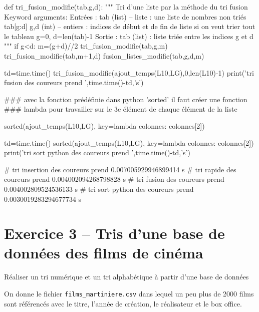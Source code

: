 \begin{corrige}
\begin{python}
def tri_fusion_modifie(tab,g,d):
    """
    Tri d'une liste par la méthode du tri fusion
    Keyword arguments:
    Entrées : 
        tab (list) -- liste : une liste de nombres non triés tab[g:d]
        g,d (int) -- entiers : indices de début et de fin de liste si on veut trier
                           tout le tableau g=0, d=len(tab)-1
    Sortie :
        tab (list) : liste triée entre les indices g et d
    """
    if g<d:
        m=(g+d)//2
        tri_fusion_modifie(tab,g,m)
        tri_fusion_modifie(tab,m+1,d)
        fusion_listes_modifie(tab,g,d,m)
        
td=time.time()
tri_fusion_modifie(ajout_temps(L10,LG),0,len(L10)-1)
print('tri fusion des coureurs prend ',time.time()-td,'s')
    

### avec la fonction prédéfinie dans python 'sorted' il faut créer une fonction
### lambda pour travailler sur le 3e élément de chaque élément de la liste

sorted(ajout_temps(L10,LG), key=lambda colonnes: colonnes[2])


td=time.time()
sorted(ajout_temps(L10,LG), key=lambda colonnes: colonnes[2])
print('tri sort python des coureurs prend ',time.time()-td,'s')


# tri insertion des coureurs prend  0.007005929946899414 s
# tri rapide des coureurs prend  0.004002094268798828 s
# tri fusion des coureurs prend  0.004002809524536133 s
# tri sort python des coureurs prend  0.0030019283294677734 s

\end{python}

\setcounter{question}{0}
\end{corrige}
\else\fi


\section*{Exercice 3 -- Tris d'une base de données des films de cinéma}



\ifprof
\else


\setcounter{exo}{0}
\begin{obj}
Réaliser un tri numérique et un tri alphabétique à partir d'une base de données
\end{obj}

On donne le fichier \texttt{films\_martiniere.csv} dans lequel un peu plus de 2000 films sont référencés avec le titre, l'année de création, le réalisateur et le box office.

